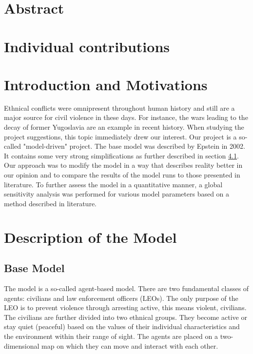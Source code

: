 \documentclass[11pt]{article}
\begin{document}
\section{Abstract}

\section{Individual contributions}

\section{Introduction and Motivations}
Ethnical conflicts were omnipresent throughout human history and still are a major source for civil violence in these days. For instance, the wars leading to the decay of former Yugoslavia are an example in recent history. When studying the project suggestions, this topic immediately drew our interest. Our project is a so-called "model-driven" project. The base model was described by Epstein in 2002. It contains some very strong simplifications as further described in section \ref{subsec:base_model}. Our approach was to modify the model in a way that describes reality better in our opinion and to compare the results of the model runs to those presented in literature. To further assess the model in a quantitative manner, a global sensitivity analysis was performed for various model parameters based on a method described in literature.

\section{Description of the Model}
\label{sec:description_model}

\subsection{Base Model}
\label{subsec:base_model}
The model is a so-called agent-based model. There are two fundamental classes of agents: civilians and law enforcement officers (LEOs). The only purpose of the LEO is to prevent violence through arresting active, this means violent, civilians. The civilians are further divided into two ethnical groups. They become active or stay quiet (peaceful) based on the values of their individual characteristics and the environment within their range of sight. The agents are placed on a two-dimensional map on which they can move and interact with each other.
\end{document}
